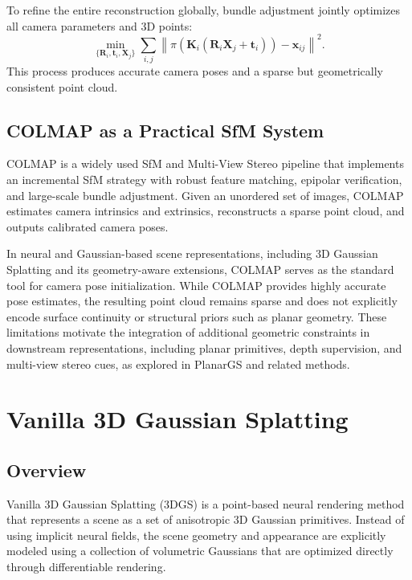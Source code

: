 To refine the entire reconstruction globally, bundle adjustment jointly optimizes all camera parameters and 3D points:
\begin{equation}
\min_{\{\mathbf{R}_i, \mathbf{t}_i, \mathbf{X}_j\}} 
\sum_{i,j} \left\| \pi(\mathbf{K}_i (\mathbf{R}_i \mathbf{X}_j + \mathbf{t}_i)) - \mathbf{x}_{ij} \right\|^2.
\end{equation}
This process produces accurate camera poses and a sparse but geometrically consistent point cloud.

\subsection{COLMAP as a Practical SfM System}

COLMAP is a widely used SfM and Multi-View Stereo pipeline that implements an incremental SfM strategy with robust feature matching, epipolar verification, and large-scale bundle adjustment. Given an unordered set of images, COLMAP estimates camera intrinsics and extrinsics, reconstructs a sparse point cloud, and outputs calibrated camera poses.

In neural and Gaussian-based scene representations, including 3D Gaussian Splatting and its geometry-aware extensions, COLMAP serves as the standard tool for camera pose initialization. While COLMAP provides highly accurate pose estimates, the resulting point cloud remains sparse and does not explicitly encode surface continuity or structural priors such as planar geometry. These limitations motivate the integration of additional geometric constraints in downstream representations, including planar primitives, depth supervision, and multi-view stereo cues, as explored in PlanarGS and related methods.


\section{Vanilla 3D Gaussian Splatting}

\subsection{Overview}

Vanilla 3D Gaussian Splatting (3DGS) is a point-based neural rendering method that represents a scene as a set of anisotropic 3D Gaussian primitives. Instead of using implicit neural fields, the scene geometry and appearance are explicitly modeled using a collection of volumetric Gaussians that are optimized directly through differentiable rendering.

